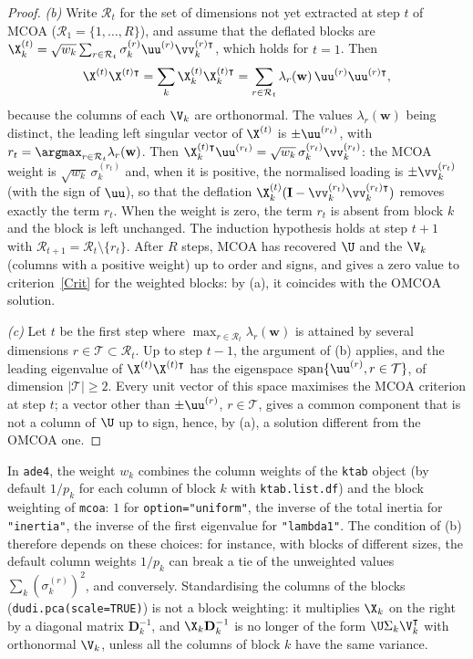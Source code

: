 \begin{proof}
\emph{(b)} Write $\mathcal R_t$ for the set of dimensions not yet extracted at
step $t$ of MCOA ($\mathcal R_1=\{1,\ldots,R\}$), and assume that the deflated
blocks are
$\X_k^{(t)}=\sqrt{w_k}\sum_{r\in\mathcal R_t}\sigma_k^{(r)}\uu^{(r)}\vv_k^{(r)\intercal}$,
which holds for $t=1$. Then
\[
  \X^{(t)}\X^{(t)\intercal}=\sum_{k}\X_k^{(t)}\X_k^{(t)\intercal}
  =\sum_{r\in\mathcal R_t}\lambda_r(\mathbf w)\,\uu^{(r)}\uu^{(r)\intercal},
\]
because the columns of each $\V_k$ are orthonormal. The values
$\lambda_r(\mathbf w)$ being distinct, the leading left singular vector of
$\X^{(t)}$ is $\pm\uu^{(r_t)}$, with $r_t=\argmax_{r\in\mathcal R_t}\lambda_r(\mathbf w)$.
Then $\X_k^{(t)\intercal}\uu^{(r_t)}=\sqrt{w_k}\,\sigma_k^{(r_t)}\vv_k^{(r_t)}$:
the MCOA weight is $\sqrt{w_k}\,\sigma_k^{(r_t)}$ and, when it is positive, the
normalised loading is $\pm\vv_k^{(r_t)}$ (with the sign of $\uu$), so that the
deflation $\X_k^{(t)}(\mathbf I-\vv_k^{(r_t)}\vv_k^{(r_t)\intercal})$ removes exactly the
term $r_t$. When the weight is zero, the term $r_t$ is absent from block $k$
and the block is left unchanged. The induction hypothesis holds at step
$t+1$ with $\mathcal R_{t+1}=\mathcal R_t\setminus\{r_t\}$. After $R$ steps,
MCOA has recovered $\U$ and the $\V_k$ (columns with a positive weight) up to
order and signs, and gives a zero value to criterion~\eqref{Crit} for the
weighted blocks: by (a), it coincides with the OMCOA solution.

\emph{(c)} Let $t$ be the first step where
$\max_{r\in\mathcal R_t}\lambda_r(\mathbf w)$ is attained by several dimensions
$r\in\mathcal T\subset\mathcal R_t$. Up to step $t-1$, the argument of (b)
applies, and the leading eigenvalue of $\X^{(t)}\X^{(t)\intercal}$ has the
eigenspace $\mathrm{span}\{\uu^{(r)},r\in\mathcal T\}$, of dimension
$|\mathcal T|\geq2$. Every unit vector of this space maximises the MCOA
criterion at step $t$; a vector other than $\pm\uu^{(r)}$, $r\in\mathcal T$,
gives a common component that is not a column of $\U$ up to sign, hence, by
(a), a solution different from the OMCOA one.
\end{proof}

\begin{remark}
In \texttt{ade4}, the weight $w_k$ combines the column weights of the
\texttt{ktab} object (by default $1/p_k$ for each column of block $k$ with
\texttt{ktab.list.df}) and the block weighting of \texttt{mcoa}: $1$ for
\texttt{option="uniform"}, the inverse of the total inertia for
\texttt{"inertia"}, the inverse of the first eigenvalue for \texttt{"lambda1"}.
The condition of (b) therefore depends on these choices: for instance, with
blocks of different sizes, the default column weights $1/p_k$ can break a tie
of the unweighted values $\sum_k(\sigma_k^{(r)})^2$, and conversely.
Standardising the columns of the blocks (\texttt{dudi.pca(scale=TRUE)}) is not
a block weighting: it multiplies $\X_k$ on the right by a diagonal matrix
$\mathbf D_k^{-1}$, and $\X_k\mathbf D_k^{-1}$ is no longer of the form
$\U\Sigma_k\V_k^\intercal$ with orthonormal $\V_k$, unless all the columns of
block $k$ have the same variance.
\end{remark}

